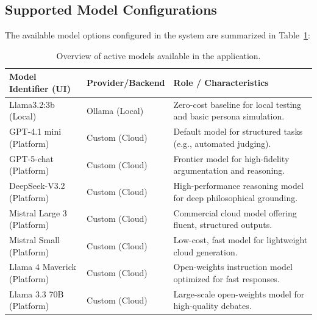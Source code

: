 \documentclass[11pt,a4paper]{article}
\begin{document}
\clearpage
\begin{appendices}
\section{Supported Model Configurations}
\label{sec:appendix-models}

The available model options configured in the system are summarized in Table~\ref{tab:models}:

\begin{table}[H]
\centering
\begin{tabular}{>{\raggedright\arraybackslash}p{3.5cm} >{\raggedright\arraybackslash}p{3.3cm} >{\raggedright\arraybackslash}p{7.2cm}}
\toprule
\textbf{Model Identifier (UI)} & \textbf{Provider\slash Backend} & \textbf{Role / Characteristics} \\
\midrule
Llama3.2:3b (Local) & Ollama (Local) & Zero-cost baseline for local testing and basic persona simulation. \\
GPT-4.1 mini (Platform) & Custom (Cloud) & Default model for structured tasks (e.g., automated judging). \\
GPT-5-chat (Platform) & Custom (Cloud) & Frontier model for high-fidelity argumentation and reasoning. \\
DeepSeek-V3.2 (Platform) & Custom (Cloud) & High-performance reasoning model for deep philosophical grounding. \\
Mistral Large 3 (Platform) & Custom (Cloud) & Commercial cloud model offering fluent, structured outputs. \\
Mistral Small (Platform) & Custom (Cloud) & Low-cost, fast model for lightweight cloud generation. \\
Llama 4 Maverick (Platform) & Custom (Cloud) & Open-weights instruction model optimized for fast responses. \\
Llama 3.3 70B (Platform) & Custom (Cloud) & Large-scale open-weights model for high-quality debates. \\
\bottomrule
\end{tabular}
\caption{Overview of active models available in the application.}
\label{tab:models}
\end{table}
\end{appendices}
\end{document}
